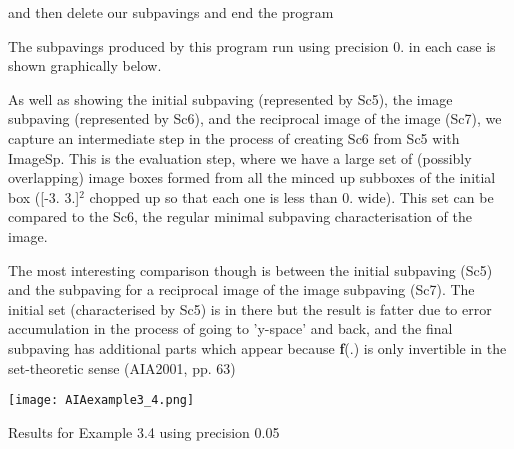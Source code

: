 and then delete our subpavings and end the program


\begin{DoxyCodeInclude}
  delete A;         // delete all Subpavings newed in dynamic memory
  delete Sc5;
  delete Sc6;
  delete Sc7;

  return 0;
}

\end{DoxyCodeInclude}


\-The subpavings produced by this program run using precision 0. in each case is shown graphically below.

\-As well as showing the initial subpaving (represented by \-Sc5), the image subpaving (represented by \-Sc6), and the reciprocal image of the image (\-Sc7), we capture an intermediate step in the process of creating \-Sc6 from \-Sc5 with \-Image\-Sp. \-This is the evaluation step, where we have a large set of (possibly overlapping) image boxes formed from all the minced up subboxes of the initial box (\mbox{[}-\/3. 3.\mbox{]}$^{\mbox{2}}$  chopped up so that each one is less than 0. wide). \-This set can be compared to the \-Sc6, the regular minimal subpaving characterisation of the image.

\-The most interesting comparison though is between the initial subpaving (\-Sc5) and the subpaving for a reciprocal image of the image subpaving (\-Sc7). \-The initial set (characterised by \-Sc5) is in there but the result is fatter due to error accumulation in the process of going to 'y-\/space' and back, and the final subpaving has additional parts which appear because {\bfseries f}(.) is only invertible in the set-\/theoretic sense (\-A\-I\-A2001, pp. 63)

 
\begin{DoxyImage}
\texttt{[image: AIAexample3\_4.png]}
\caption{\-Results for \-Example 3.4 using precision 0.05}
\end{DoxyImage}
 